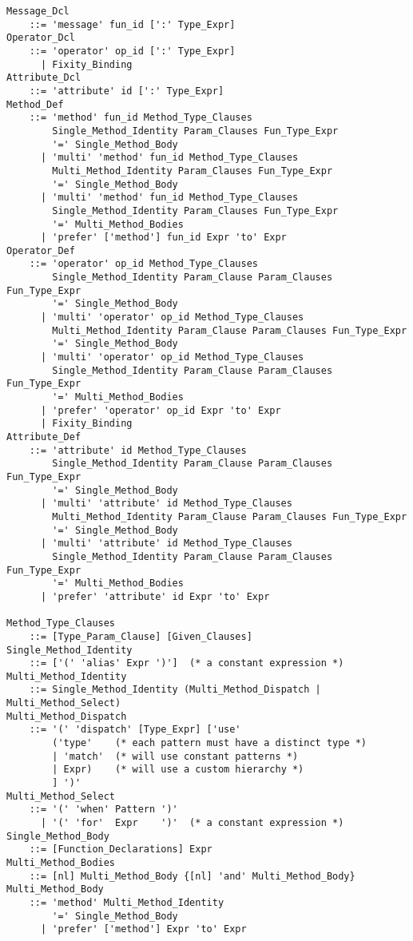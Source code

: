 \grammar\begin{lstlisting}
Message_Dcl 
    ::= 'message' fun_id [':' Type_Expr]
Operator_Dcl 
    ::= 'operator' op_id [':' Type_Expr]
      | Fixity_Binding
Attribute_Dcl 
    ::= 'attribute' id [':' Type_Expr]
Method_Def 
    ::= 'method' fun_id Method_Type_Clauses
        Single_Method_Identity Param_Clauses Fun_Type_Expr
        '=' Single_Method_Body
      | 'multi' 'method' fun_id Method_Type_Clauses
        Multi_Method_Identity Param_Clauses Fun_Type_Expr
        '=' Single_Method_Body
      | 'multi' 'method' fun_id Method_Type_Clauses 
        Single_Method_Identity Param_Clauses Fun_Type_Expr
        '=' Multi_Method_Bodies
      | 'prefer' ['method'] fun_id Expr 'to' Expr
Operator_Def
    ::= 'operator' op_id Method_Type_Clauses 
        Single_Method_Identity Param_Clause Param_Clauses Fun_Type_Expr
        '=' Single_Method_Body
      | 'multi' 'operator' op_id Method_Type_Clauses 
        Multi_Method_Identity Param_Clause Param_Clauses Fun_Type_Expr
        '=' Single_Method_Body
      | 'multi' 'operator' op_id Method_Type_Clauses
        Single_Method_Identity Param_Clause Param_Clauses Fun_Type_Expr
        '=' Multi_Method_Bodies
      | 'prefer' 'operator' op_id Expr 'to' Expr
      | Fixity_Binding
Attribute_Def
    ::= 'attribute' id Method_Type_Clauses
        Single_Method_Identity Param_Clause Param_Clauses Fun_Type_Expr
        '=' Single_Method_Body
      | 'multi' 'attribute' id Method_Type_Clauses
        Multi_Method_Identity Param_Clause Param_Clauses Fun_Type_Expr
        '=' Single_Method_Body
      | 'multi' 'attribute' id Method_Type_Clauses
        Single_Method_Identity Param_Clause Param_Clauses Fun_Type_Expr
        '=' Multi_Method_Bodies
      | 'prefer' 'attribute' id Expr 'to' Expr

Method_Type_Clauses
    ::= [Type_Param_Clause] [Given_Clauses]
Single_Method_Identity
    ::= ['(' 'alias' Expr ')']  (* a constant expression *)
Multi_Method_Identity
    ::= Single_Method_Identity (Multi_Method_Dispatch | Multi_Method_Select)
Multi_Method_Dispatch
    ::= '(' 'dispatch' [Type_Expr] ['use' 
        ('type'    (* each pattern must have a distinct type *)
        | 'match'  (* will use constant patterns *)
        | Expr)    (* will use a custom hierarchy *)
        ] ')'
Multi_Method_Select
    ::= '(' 'when' Pattern ')'
      | '(' 'for'  Expr    ')'  (* a constant expression *)
Single_Method_Body
    ::= [Function_Declarations] Expr
Multi_Method_Bodies
    ::= [nl] Multi_Method_Body {[nl] 'and' Multi_Method_Body}
Multi_Method_Body
    ::= 'method' Multi_Method_Identity 
        '=' Single_Method_Body
      | 'prefer' ['method'] Expr 'to' Expr


\end{lstlisting}
